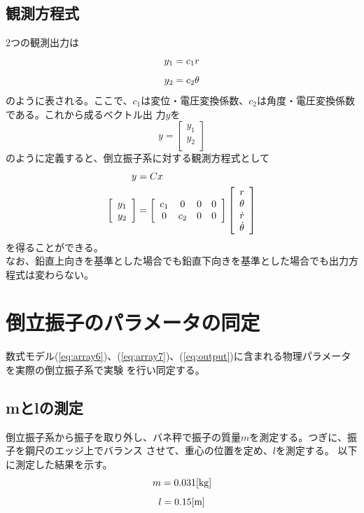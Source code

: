 \subsection{観測方程式}
	2つの観測出力は
	\[
		y_{1} = c_{1}r\\
	\]
	\[
		y_{2} = c_{2}\theta\\
	\]
	のように表される。ここで、$c_{1}$は変位・電圧変換係数、$c_{2}$は角度・電圧変換係数である。これから成るベクトル出
	力$y$を\\
	\[
		y=\left[
		\begin{array}{c}
			y_{1}\\
			y_{2}\\
		\end{array}
		\right]
	\]
	のように定義すると、倒立振子系に対する観測方程式として\\
	\begin{align}
		y&=Cx \notag \\
		\left[
		\begin{array}{c}
			y_{1}\\
			y_{2}\\
		\end{array}
		\right]&=\left[
		\begin{array}{cccc}
			c_{1} & 0 & 0 & 0 \\
			0 & c_{2} & 0 & 0\\
		\end{array}
		\right]\left[
		\begin{array}{c}
			r\\
			\theta\\
			\dot{r}\\
			\dot{\theta}\\
		\end{array}
		\right]
		\label{eq:output}
	\end{align}
	を得ることができる。\\
	なお、鉛直上向きを基準とした場合でも鉛直下向きを基準とした場合でも出力方程式は変わらない。
\section{倒立振子のパラメータの同定}
数式モデル(\ref{eq:array6})、(\ref{eq:array7})、(\ref{eq:output})に含まれる物理パラメータを実際の倒立振子系で実験
を行い同定する。
\subsection{mとlの測定}
	倒立振子系から振子を取り外し、バネ秤で振子の質量$m$を測定する。つぎに、振子を鋼尺のエッジ上でバランス
	させて、重心の位置を定め、$l$を測定する。
	以下に測定した結果を示す。
	\[m = 0.031[\rm{kg}]\]
	\[l = 0.15[\rm{m}]\]
